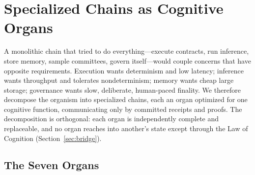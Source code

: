\section{Specialized Chains as Cognitive Organs}
\label{sec:organs}

A monolithic chain that tried to do everything---execute contracts, run inference, store memory, sample committees, govern itself---would couple concerns that have opposite requirements. Execution wants determinism and low latency; inference wants throughput and tolerates nondeterminism; memory wants cheap large storage; governance wants slow, deliberate, human-paced finality. We therefore decompose the organism into specialized chains, each an organ optimized for one cognitive function, communicating only by committed receipts and proofs. The decomposition is orthogonal: each organ is independently complete and replaceable, and no organ reaches into another's state except through the Law of Cognition (Section~\ref{sec:bridge}).

\subsection{The Seven Organs}

